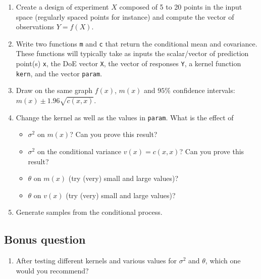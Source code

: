 \documentclass[11pt]{scrartcl}
\begin{document}
\begin{enumerate}[resume]
	\item Create a design of experiment $X$ composed of 5 to 20 points in the input space (regularly spaced points for instance) and compute the vector of observations $Y = f(X)$.
	\item Write two functions \texttt{m} and \texttt{c} that return the conditional mean and covariance. These functions will typically take as inputs the scalar/vector of prediction point(s) \texttt{x}, the DoE vector \texttt{X}, the vector of responses \texttt{Y}, a kernel function \texttt{kern}, and the vector \texttt{param}.
	\item Draw on the same graph $f(x)$, $m(x)$ and $95\%$ confidence intervals: $m(x) \pm 1.96\sqrt{c(x,x)}$. 
	\item Change the kernel as well as the values in \texttt{param}. What is the effect of
	\begin{itemize}
	 	\item $\sigma^2$ on $m(x)$? Can you prove this result?
	 	\item $\sigma^2$ on the conditional variance $v(x) = c(x,x)$? Can you prove this result?
	 	\item $\theta$ on $m(x)$ (try (very) small  and large values)?
	 	\item $\theta$ on $v(x)$ (try (very) small  and large values)?
	 \end{itemize}
	\item Generate samples from the conditional process. 

\end{enumerate}

\subsection*{Bonus question}

\begin{enumerate}[resume]
		\item After testing different kernels and various values for $\sigma^2$ and $\theta$, which one would you recommend?
\end{enumerate}
\end{document}

